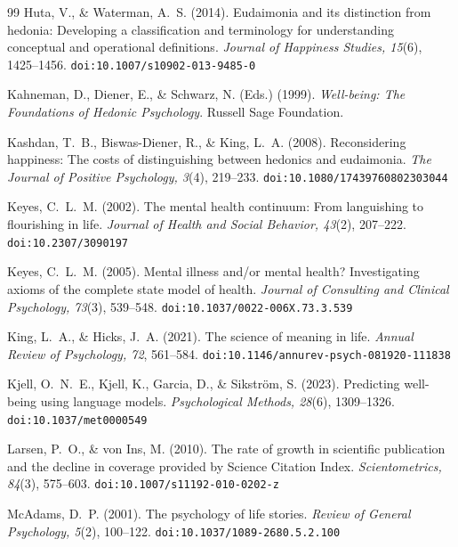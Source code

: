 \documentclass[12pt,a4paper]{article}
\begin{document}
\begin{thebibliography}{99}
Huta, V., \& Waterman, A.~S. (2014).
Eudaimonia and its distinction from hedonia: Developing a classification and terminology for understanding conceptual and operational definitions.
\textit{Journal of Happiness Studies, 15}(6), 1425--1456.
\texttt{doi:10.1007/s10902-013-9485-0}

Kahneman, D., Diener, E., \& Schwarz, N. (Eds.) (1999).
\textit{Well-being: The Foundations of Hedonic Psychology}.
Russell Sage Foundation.

Kashdan, T.~B., Biswas-Diener, R., \& King, L.~A. (2008).
Reconsidering happiness: The costs of distinguishing between hedonics and eudaimonia.
\textit{The Journal of Positive Psychology, 3}(4), 219--233.
\texttt{doi:10.1080/17439760802303044}

Keyes, C.~L.~M. (2002).
The mental health continuum: From languishing to flourishing in life.
\textit{Journal of Health and Social Behavior, 43}(2), 207--222.
\texttt{doi:10.2307/3090197}

Keyes, C.~L.~M. (2005).
Mental illness and/or mental health? Investigating axioms of the complete state model of health.
\textit{Journal of Consulting and Clinical Psychology, 73}(3), 539--548.
\texttt{doi:10.1037/0022-006X.73.3.539}

King, L.~A., \& Hicks, J.~A. (2021).
The science of meaning in life.
\textit{Annual Review of Psychology, 72}, 561--584.
\texttt{doi:10.1146/annurev-psych-081920-111838}

Kjell, O.~N.~E., Kjell, K., Garcia, D., \& Sikstr{\"o}m, S. (2023).
Predicting well-being using language models.
\textit{Psychological Methods, 28}(6), 1309--1326.
\texttt{doi:10.1037/met0000549}

Larsen, P.~O., \& von Ins, M. (2010).
The rate of growth in scientific publication and the decline in coverage provided by Science Citation Index.
\textit{Scientometrics, 84}(3), 575--603.
\texttt{doi:10.1007/s11192-010-0202-z}

McAdams, D.~P. (2001).
The psychology of life stories.
\textit{Review of General Psychology, 5}(2), 100--122.
\texttt{doi:10.1037/1089-2680.5.2.100}


\end{thebibliography}
\end{document}

